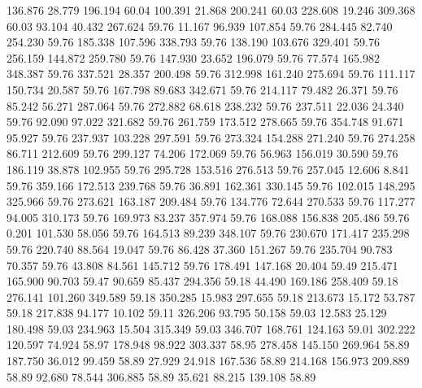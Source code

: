  136.876   28.779  196.194        60.04
 100.391   21.868  200.241        60.03
 228.608   19.246  309.368        60.03
  93.104   40.432  267.624        59.76
  11.167   96.939  107.854        59.76
 284.445   82.740  254.230        59.76
 185.338  107.596  338.793        59.76
 138.190  103.676  329.401        59.76
 256.159  144.872  259.780        59.76
 147.930   23.652  196.079        59.76
  77.574  165.982  348.387        59.76
 337.521   28.357  200.498        59.76
 312.998  161.240  275.694        59.76
 111.117  150.734   20.587        59.76
 167.798   89.683  342.671        59.76
 214.117   79.482   26.371        59.76
  85.242   56.271  287.064        59.76
 272.882   68.618  238.232        59.76
 237.511   22.036   24.340        59.76
  92.090   97.022  321.682        59.76
 261.759  173.512  278.665        59.76
 354.748   91.671   95.927        59.76
 237.937  103.228  297.591        59.76
 273.324  154.288  271.240        59.76
 274.258   86.711  212.609        59.76
 299.127   74.206  172.069        59.76
  56.963  156.019   30.590        59.76
 186.119   38.878  102.955        59.76
 295.728  153.516  276.513        59.76
 257.045   12.606    8.841        59.76
 359.166  172.513  239.768        59.76
  36.891  162.361  330.145        59.76
 102.015  148.295  325.966        59.76
 273.621  163.187  209.484        59.76
 134.776   72.644  270.533        59.76
 117.277   94.005  310.173        59.76
 169.973   83.237  357.974        59.76
 168.088  156.838  205.486        59.76
   0.201  101.530   58.056        59.76
 164.513   89.239  348.107        59.76
 230.670  171.417  235.298        59.76
 220.740   88.564   19.047        59.76
  86.428   37.360  151.267        59.76
 235.704   90.783   70.357        59.76
  43.808   84.561  145.712        59.76
 178.491  147.168   20.404        59.49
 215.471  165.900   90.703        59.47
  90.659   85.437  294.356        59.18
  44.490  169.186  258.409        59.18
 276.141  101.260  349.589        59.18
 350.285   15.983  297.655        59.18
 213.673   15.172   53.787        59.18
 217.838   94.177   10.102        59.11
 326.206   93.795   50.158        59.03
  12.583   25.129  180.498        59.03
 234.963   15.504  315.349        59.03
 346.707  168.761  124.163        59.01
 302.222  120.597   74.924        58.97
 178.948   98.922  303.337        58.95
 278.458  145.150  269.964        58.89
 187.750   36.012   99.459        58.89
  27.929   24.918  167.536        58.89
 214.168  156.973  209.889        58.89
  92.680   78.544  306.885        58.89
  35.621   88.215  139.108        58.89

